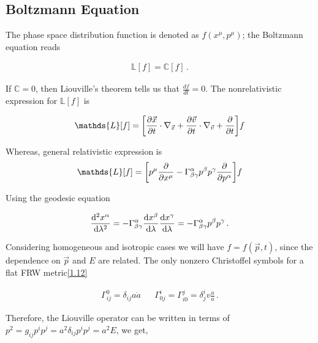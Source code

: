 \begin{appendices}

\chapter{Boltzmann Equation}\label{Boltzmann Equation}
The phase space distribution function is denoted as \(f(x^{\mu }, p^{\mu })\); the Boltzmann equation reads 

\begin{align}
    \mathds{L}[f] = \mathds{C}[f] \,.\label{eq:A.1}
\end{align}

If \(\mathds{C} = 0\), then Liouville's theorem tells us that \(\frac{df}{dt} = 0\). 
The nonrelativistic expression for \(\mathds{L}[f]\) is 

\begin{align}
    \mathds{L}[f] = \qty[ \pdv{\vec{x}}{t} \cdot \nabla_{\vec{x}} + \pdv{\vec{v}}{t} \cdot \nabla_{\vec{v}} +\pdv{}{t}]f \label{eq:A.2}
\end{align}

Whereas, general relativistic expression is 
\begin{align}
    \mathds{L}[f] = \qty[p^{\mu } \pdv{}{x^{\mu }} - \Gamma^{\alpha }_{\beta \gamma } p^{\beta } p^{\gamma } \pdv{}{p^{\alpha }}]f \label{eq:A.3}
\end{align}

Using the geodesic equation 

\begin{align}
    \dv[2]{x^{\alpha}}{\lambda} 
    = - \Gamma^{\alpha}_{\beta \gamma } \dv{x^{\beta }}{\lambda } \dv{x^{\gamma }}{\lambda }  
    = - \Gamma^{\alpha }_{\beta \gamma } p^{\beta } p^{\gamma }\,.\label{eq:A.4}
\end{align}

Considering homogeneous and isotropic cases we will have \(f = f (\vec{p}, t)\), since the dependence on \(\vec{p}\) and \(E\) are related. The only nonzero Christoffel symbols for a flat FRW metric\eqref{1.12}

\begin{align}
    \Gamma^{0}_{ij} = \delta_{ij} a \dot{a} && \Gamma^{i}_{0j} = \Gamma^{j}_{i0}= \delta^{i}_{j}v\frac{\dot{a}}{a}\,.\label{eq:A.5}
\end{align}

Therefore, the Liouville operator can be written in terms of \(p^2 = g_{ij} p^{i}p^{j} = a^2 \delta_{ij} p^{i} p^{j} =  a^2 E\), we get,


\end{appendices}
